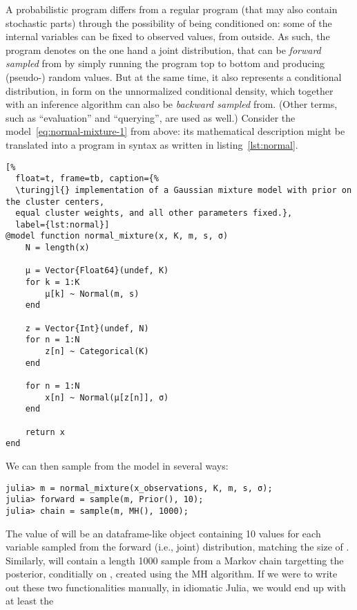 A probabilistic program differs from a regular program (that may also contain stochastic parts)
through the possibility of being conditioned on: some of the internal variables can be fixed to
observed values, from outside. As such, the program denotes on the one hand a joint distribution,
that can be \emph{forward sampled} from by simply running the program top to bottom and producing
(pseudo-) random values.  But at the same time, it also represents a conditional distribution, in
form on the unnormalized conditional density, which together with an inference algorithm can also be
\emph{backward sampled} from.  (Other terms, such as \enquote{evaluation} and \enquote{querying},
are used as well.)  Consider the model~\eqref{eq:normal-mixture-1} from above: its mathematical
description might be translated into a program in \turingjl{} syntax
\parencite{ge2018turing,tarek2020dynamicppl} as written in
listing~\ref{lst:normal}.
\begin{lstlisting}[%
  float=t, frame=tb, caption={%
  \turingjl{} implementation of a Gaussian mixture model with prior on the cluster centers,
  equal cluster weights, and all other parameters fixed.},
  label={lst:normal}]
@model function normal_mixture(x, K, m, s, σ)
    N = length(x)

    μ = Vector{Float64}(undef, K)
    for k = 1:K
        μ[k] ~ Normal(m, s)
    end

    z = Vector{Int}(undef, N)
    for n = 1:N
        z[n] ~ Categorical(K)
    end

    for n = 1:N
        x[n] ~ Normal(μ[z[n]], σ)
    end

    return x
end
\end{lstlisting}
We can then sample from the model in several ways:
\begin{lstlisting}
julia> m = normal_mixture(x_observations, K, m, s, σ);
julia> forward = sample(m, Prior(), 10);
julia> chain = sample(m, MH(), 1000);
\end{lstlisting}
The value of  will be an dataframe-like object containing 10 values for each variable
sampled from the forward (i.e., joint) distribution, matching the size of .
Similarly,  will contain a length 1000 sample from a Markov chain targetting the
posterior, conditially on , created using the MH algorithm.  If we were to
write out these two functionalities manually, in idiomatic Julia, we would end up with at least the
